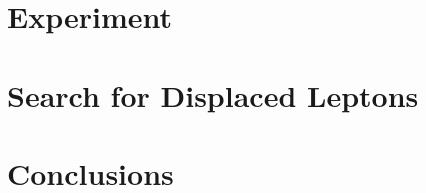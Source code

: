 \documentclass{ucetd}
\begin{document}
\part{Experiment}







\cleardoublepage 

\part{Search for Displaced Leptons}








\cleardoublepage 

\part{Conclusions}

\cleardoublepage 


\printbibliography[heading=bibintoc,title={References}]

%
%
\end{document}
